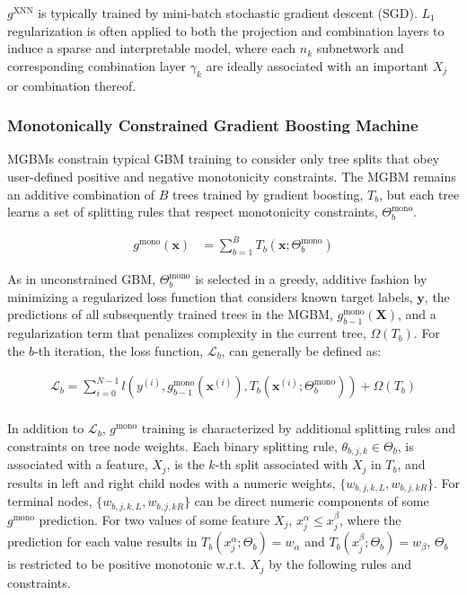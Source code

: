 \documentclass[information,article,submit,moreauthors,pdftex]{definitions/mdpi}
\begin{document}
\noindent $g^{\text{XNN}}$ is typically trained by mini-batch stochastic gradient descent (SGD). $L_1$ regularization is often applied to both the projection and combination layers to induce a sparse and interpretable model, where each $n_k$ subnetwork and corresponding combination layer $\gamma_k$ are ideally associated with an important $X_j$ or combination thereof.

\subsubsection{Monotonically Constrained Gradient Boosting Machine}

MGBMs constrain typical GBM training to consider only tree splits that obey user-defined positive and negative monotonicity constraints. The MGBM remains an additive combination of $B$ trees trained by gradient boosting, $T_b$, but each tree learns a set of splitting rules that respect monotonicity constraints,  $\Theta^\text{mono}_b$. 

\begin{equation}
\begin{aligned}\label{eq:rf}
g^{\text{mono}}(\mathbf{x}) &= \sum_{b=1}^B T_b\left(\mathbf{x}; \Theta^\text{mono}_b\right)
\end{aligned}
\end{equation}

\noindent As in unconstrained GBM, $\Theta^{\text{mono}}_b$ is selected in a greedy, additive fashion by minimizing a regularized loss function that considers known target labels, $\mathbf{y}$, the predictions of all subsequently trained trees in the MGBM, $g^{\text{mono}}_{b-1}(\mathbf{X})$, and a regularization term that penalizes complexity in the current tree, $\Omega(T_b)$. For the $b$-th iteration, the loss function, $\mathcal{L}_{b}$, can generally be defined as:

\begin{equation}
\begin{aligned}
\mathcal{L}_{b} =\sum_{i=0}^{N-1}l(y^{(i)}, g^{\text{mono}}_{b-1}(\mathbf{x}^{(i)}), T_b(\mathbf{x}^{(i)};\Theta^\text{mono}_b)) + \Omega(T_b)\\
\end{aligned}
\end{equation}

\noindent In addition to $\mathcal{L}_{b}$, $g^\text{mono}$ training is characterized by additional splitting rules and constraints on tree node weights. Each binary splitting rule, $\theta_{b,j,k} \in \Theta_b$, is associated with a feature, $X_j$, is the $k$-th split associated with $X_j$ in $T_b$, and results in left and right child nodes with a numeric weights, $\{w_{b,j,k,L}, w_{b,j,kR}\}$. For terminal nodes, $\{w_{b,j,k,L}, w_{b,j,kR}\}$ can be direct numeric components of some $g^\text{mono}$ prediction. For two values of some feature $X_j$, $x^{\alpha}_j \le x^{\beta}_j$, where the prediction for each value results in $T_b(x^{\alpha}_j; \Theta_b) = w_\alpha$ and $T_b(x^{\beta}_j; \Theta_b) = w_\beta$, $\Theta_b$ is restricted to be positive monotonic w.r.t. $X_j$ by the following rules and constraints.
\end{document}
